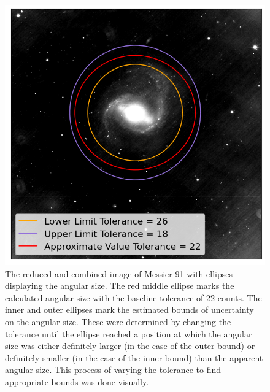 \documentclass[%
reprint,
amsmath,amssymb,
aps,
]{revtex4-2}
\begin{document}
			\begin{figure}
				\includegraphics[width=\columnwidth]{angularSize.png}
				\caption{\label{fig:angSize} The reduced and combined image of Messier 91 with ellipses displaying the angular size. The red middle ellipse marks the calculated angular size with the baseline tolerance of 22 counts. The inner and outer ellipses mark the estimated bounds of uncertainty on the angular size. These were determined by changing the tolerance until the ellipse reached a position at which the angular size was either definitely larger (in the case of the outer bound) or definitely smaller (in the case of the inner bound) than the apparent angular size. This process of varying the tolerance to find appropriate bounds was done visually.}
			\end{figure}
			
		
\end{document}

